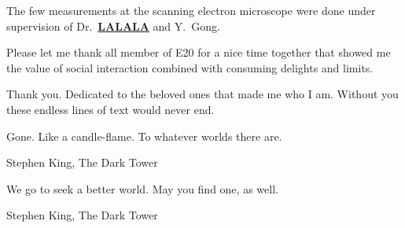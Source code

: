 	The few measurements at the scanning electron microscope were done under supervision of Dr.\ \textbf{\underline{LALALA}} and Y.\ Gong.

	Please let me thank all member of E20 for a nice time together that showed me the value of social interaction combined with consuming delights and limits.

\begin{center}Thank you.
\newpage 
\thispagestyle{empty}
Dedicated to the beloved ones that made me who I am. Without you these endless lines of text would never end. 
\epigraph{Gone. Like a candle-flame. To whatever worlds there are.}{Stephen King, The Dark Tower}
\epigraph{We go to seek a better world. May you find one, as well.}{Stephen King, The Dark Tower}
\end{center}
\cleardoublepage{}